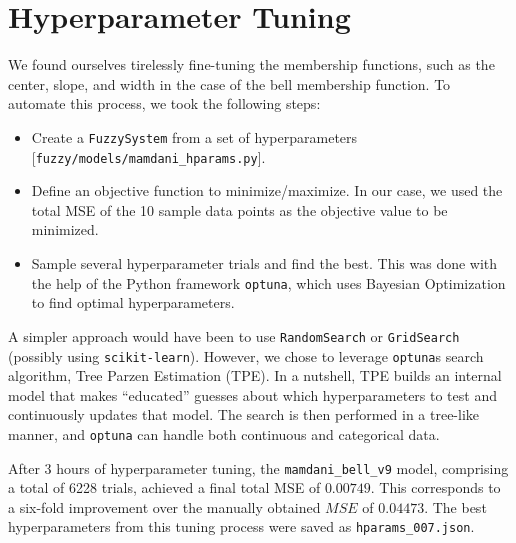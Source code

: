 \documentclass[titlepage]{article}
\newcommand*\apos{\textsc{\char13}}
\begin{document}


\section{Hyperparameter Tuning}
\label{sec:hyper_tuning}

We found ourselves tirelessly fine-tuning the membership functions, such as the center, slope, and width in the case of the bell membership function.
To automate this process, we took the following steps:

\begin{itemize}
    \item Create a \texttt{FuzzySystem} from a set of hyperparameters [\texttt{fuzzy/models/mamdani\_hparams.py}].
    \item Define an objective function to minimize/maximize.
          In our case, we used the total MSE of the 10 sample data points as the objective value to be minimized.
    \item Sample several hyperparameter trials and find the best.
          This was done with the help of the Python framework \texttt{optuna}, which uses Bayesian Optimization to find optimal hyperparameters.
\end{itemize}

A simpler approach would have been to use \texttt{RandomSearch} or \texttt{GridSearch} (possibly using \texttt{scikit-learn}).
However, we chose to leverage \texttt{optuna}\apos s search algorithm, Tree Parzen Estimation (TPE).
In a nutshell, TPE builds an internal model that makes ``educated'' guesses about which hyperparameters to test and continuously updates that model.
The search is then performed in a tree-like manner, and \texttt{optuna} can handle both continuous and categorical data.

After 3 hours of hyperparameter tuning, the \texttt{mamdani\_bell\_v9} model, comprising a total of 6228 trials, achieved a final total MSE of $0.00749$.
This corresponds to a six-fold improvement over the manually obtained $MSE$ of $0.04473$.
The best hyperparameters from this tuning process were saved as \texttt{hparams\_007.json}.
\end{document}
